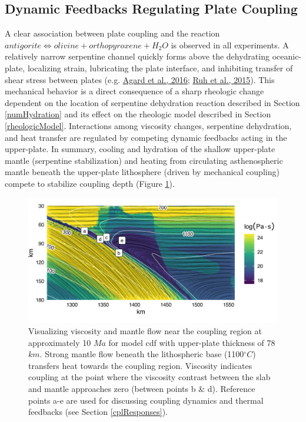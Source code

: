 \hypertarget{dynamic-feedbacks-regulating-plate-coupling}{%
\subsection{Dynamic Feedbacks Regulating Plate Coupling}\label{dynamic-feedbacks-regulating-plate-coupling}}

A clear association between plate coupling and the reaction \(antigorite \allowbreak \Leftrightarrow olivine + orthopyroxene + H_{2}O\) is observed in all experiments. A relatively narrow serpentine channel quickly forms above the dehydrating oceanic-plate, localizing strain, lubricating the plate interface, and inhibiting transfer of shear stress between plates (e.g. \protect\hyperlink{ref-agard2016}{Agard et al., 2016}; \protect\hyperlink{ref-ruh2015}{Ruh et al., 2015}). This mechanical behavior is a direct consequence of a sharp rheologic change dependent on the location of serpentine dehydration reaction described in Section \ref{numHydration} and its effect on the rheologic model described in Section \ref{rheologicModel}. Interactions among viscosity changes, serpentine dehydration, and heat transfer are regulated by competing dynamic feedbacks acting in the upper-plate. In summary, cooling and hydration of the shallow upper-plate mantle (serpentine stabilization) and heating from circulating asthenospheric mantle beneath the upper-plate lithosphere (driven by mechanical coupling) compete to stabilize coupling depth (Figure \ref{fig:flow}).

\begin{figure}[htbp]

{\centering \includegraphics[width=1\linewidth,]{assets/figs/chpt2/fig6} 

}

\caption[Visualizing viscosity and mantle flow]{Visualizing viscosity and mantle flow near the coupling region at approximately 10 $Ma$ for model cdf with upper-plate thickness of 78 $km$. Strong mantle flow beneath the lithospheric base (1100$^{\circ}C$) transfers heat towards the coupling region. Viscosity indicates coupling at the point where the viscosity contrast between the slab and mantle approaches zero (between points b \& d). Reference points a-e are used for discussing coupling dynamics and thermal feedbacks (see Section \ref{cplResponses}).}\label{fig:flow}
\end{figure}


